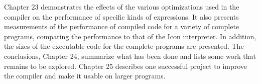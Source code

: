 Chapter 23 demonstrates the effects of the various optimizations used
in the compiler on the performance of specific kinds of
expressions. It also presents measurements of the performance of
compiled code for a variety of complete programs, comparing the
performance to that of the Icon interpreter. In addition, the sizes of
the executable code for the complete programs are presented. The
conclusions, Chapter 24, summarize what has been done and lists some
work that remains to be explored. Chapter 25 describes one successful
project to improve the compiler and make it usable on larger programs.


\bigskip


\bigskip

